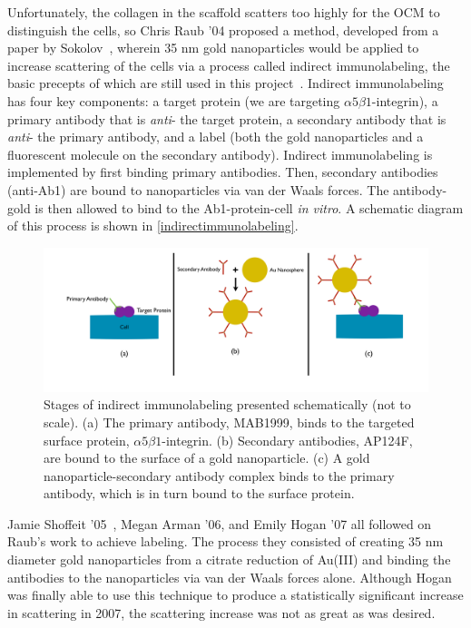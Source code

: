 Unfortunately, the collagen in the scaffold scatters too highly for the OCM to distinguish the cells, so Chris Raub '04 proposed a method, developed from a paper by Sokolov~\citep{Sokolov}, wherein 35 nm gold nanoparticles would be applied to increase scattering of the cells via a process called indirect immunolabeling, the basic precepts of which are still used in this project~\citep{raub}. Indirect immunolabeling has four key components: a target protein (we are targeting $\alpha 5 \beta 1$-integrin), a primary antibody that is \emph{anti}- the target protein, a secondary antibody that is \emph{anti}- the primary antibody, and a label (both the gold nanoparticles and a fluorescent molecule on the secondary antibody). Indirect immunolabeling is implemented by first binding primary antibodies. Then, secondary antibodies (anti-Ab1) are bound to nanoparticles via van der Waals forces. The antibody-gold is then allowed to bind to the Ab1-protein-cell \emph{in vitro}. A schematic diagram of this process is shown in \autoref{indirectimmunolabeling}.

\begin{figure}[htbp]
\centering
\includegraphics[keepaspectratio,width=\textwidth,height=0.75\textheight]{./IndirectImmunolabeling.pdf}
\caption{Stages of indirect immunolabeling presented schematically (not to scale). (a) The primary antibody, MAB1999, binds to the targeted surface protein, $\alpha 5 \beta 1$-integrin. (b) Secondary antibodies, AP124F, are bound to the surface of a gold nanoparticle. (c) A gold nanoparticle-secondary antibody complex binds to the primary antibody, which is in turn bound to the surface protein.}
\label{indirectimmunolabeling}
\end{figure}



Jamie Shoffeit '05~\citep{chanshoffeit}, Megan Arman '06, and Emily Hogan '07 all followed on Raub's work to achieve labeling. The process they consisted of creating 35 nm diameter gold nanoparticles from a citrate reduction of Au(III) and binding the antibodies to the nanoparticles via van der Waals forces alone. Although Hogan was finally able to use this technique to produce a statistically significant increase in scattering in 2007, the scattering increase was not as great as was desired.

